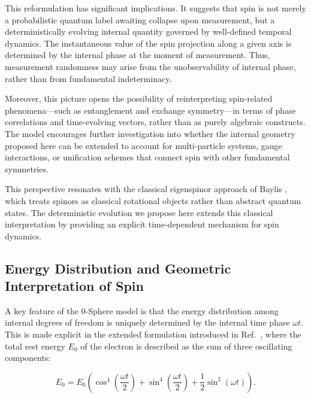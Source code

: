 \documentclass[%
 reprint,
 amsmath,amssymb,
 aps,
]{revtex4-1}
\numberwithin{equation}{section}%
\begin{document}
This reformulation has significant implications. It suggests that spin is not merely a probabilistic quantum label awaiting collapse upon measurement, but a deterministically evolving internal quantity governed by well-defined temporal dynamics. The instantaneous value of the spin projection along a given axis is determined by the internal phase at the moment of measurement. Thus, measurement randomness may arise from the unobservability of internal phase, rather than from fundamental indeterminacy.

Moreover, this picture opens the possibility of reinterpreting spin-related phenomena—such as entanglement and exchange symmetry—in terms of phase correlations and time-evolving vectors, rather than as purely algebraic constructs. The model encourages further investigation into whether the internal geometry proposed here can be extended to account for multi-particle systems, gauge interactions, or unification schemes that connect spin with other fundamental symmetries.

This perspective resonates with the classical eigenspinor approach of Baylis \cite{baylis1992}, which treats spinors as classical rotational objects rather than abstract quantum states. The deterministic evolution we propose here extends this classical interpretation by providing an explicit time-dependent mechanism for spin dynamics.


\subsection{Energy Distribution and Geometric Interpretation of Spin}

A key feature of the 0-Sphere model is that the energy distribution among internal degrees of freedom is uniquely determined by the internal time phase $\omega t$. This is made explicit in the extended formulation introduced in Ref.~\cite{hanamura2501.0130}, where the total rest energy $E_0$ of the electron is described as the sum of three oscillating components:

\begin{equation}
E_{0} = E_{0} \left( \cos^{4} \left( \frac{\omega t}{2} \right) + \sin^{4} \left( \frac{\omega t}{2} \right) + \frac{1}{2} \sin^{2} (\omega t) \right).
\label{eq:total_hamiltonian}
\end{equation}
\end{document}
